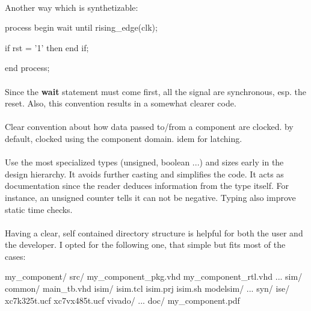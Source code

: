 \documentclass[12pt]{article}
\begin{document}
\paragraph{}
Another way which is synthetizable:
\begin{vhdl}
process
begin
 wait until rising_edge(clk);

 if rst = '1' then
 end if;

end process;
\end{vhdl}

\paragraph{}
Since the \textbf{wait} statement must come first, all the signal
are synchronous, esp. the reset. Also, this convention results in
a somewhat clearer code.



\paragraph{}
Clear convention about how data passed to/from a component are
clocked. by default, clocked using the component domain. idem for
latching.



\paragraph{}
Use the most specialized types (unsigned, boolean ...) and sizes
early in the design hierarchy. It avoids further casting and
simplifies the code. It acts as documentation since the reader
deduces information from the type itself. For instance, an
unsigned counter tells it can not be negative. Typing also
improve static time checks.



\paragraph{}
Having a clear, self contained directory structure is helpful
for both the user and the developer. I opted for the following
one, that simple but fits most of the cases:
\begin{sh}
my_component/
 src/
  my_component_pkg.vhd
  my_component_rtl.vhd
  ...
 sim/
  common/
   main_tb.vhd
  isim/
   isim.tcl
   isim.prj
   isim.sh
  modelsim/
   ...
 syn/
  ise/
   xc7k325t.ucf
   xc7vx485t.ucf
  vivado/
   ...
 doc/
  my_component.pdf
\end{sh}
\end{document}
